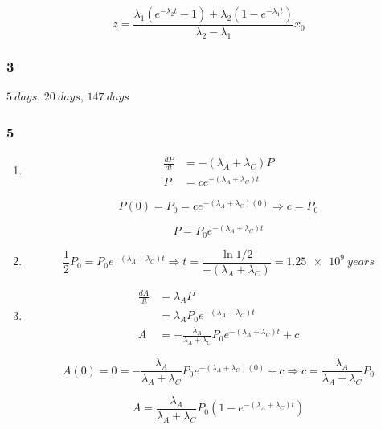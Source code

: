 \documentclass{article}
\begin{document}
\[z = \frac{\lambda_1 (e^{-\lambda_2 t} - 1) + \lambda_2 (1 - e^{-\lambda_1 t})}{\lambda_2 - \lambda_1} x_0\]

\subsubsection{3}

$\qty{5}{days}$, $\qty{20}{days}$, $\qty{147}{days}$

\subsubsection{5}

\begin{enumerate}
  \item

        \begin{align*}
          \frac{dP}{dt} & = -(\lambda_A + \lambda_C) P       \\
          P             & = c e^{-(\lambda_A + \lambda_C) t}
        \end{align*}

        \[P(0) = P_0 = c e^{-(\lambda_A + \lambda_C) (0)} \Rightarrow c = P_0\]

        \[P = P_0 e^{-(\lambda_A + \lambda_C) t}\]

  \item \[\frac{1}{2} P_0 = P_0 e^{-(\lambda_A + \lambda_C) t} \Rightarrow t = \frac{\ln 1 / 2}{-(\lambda_A + \lambda_C)} = \qty{1.25e9}{years}\]

  \item

        \begin{align*}
          \frac{dA}{dt} & = \lambda_A P                                                                     \\
                        & = \lambda_A P_0 e^{-(\lambda_A + \lambda_C) t}                                    \\
          A             & = -\frac{\lambda_A}{\lambda_A + \lambda_C} P_0 e^{-(\lambda_A + \lambda_C) t} + c
        \end{align*}

        \[A(0) = 0 = -\frac{\lambda_A}{\lambda_A + \lambda_C} P_0 e^{-(\lambda_A + \lambda_C) (0)} + c \Rightarrow c = \frac{\lambda_A}{\lambda_A + \lambda_C} P_0\]

        \[A = \frac{\lambda_A}{\lambda_A + \lambda_C} P_0 (1 - e^{-(\lambda_A + \lambda_C) t})\]


\end{enumerate}
\end{document}
